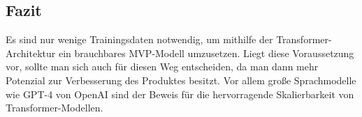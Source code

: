 \subsection*{Fazit}\label{sec:fazit}

Es sind nur wenige Trainingsdaten notwendig, um mithilfe der Transformer-Architektur ein brauchbares MVP-Modell umzusetzen. Liegt diese Voraussetzung vor, sollte man sich auch für diesen Weg entscheiden, da man dann mehr Potenzial zur Verbesserung des Produktes besitzt. Vor allem große Sprachmodelle wie GPT-4 von OpenAI sind der Beweis für die hervorragende Skalierbarkeit von Transformer-Modellen.
